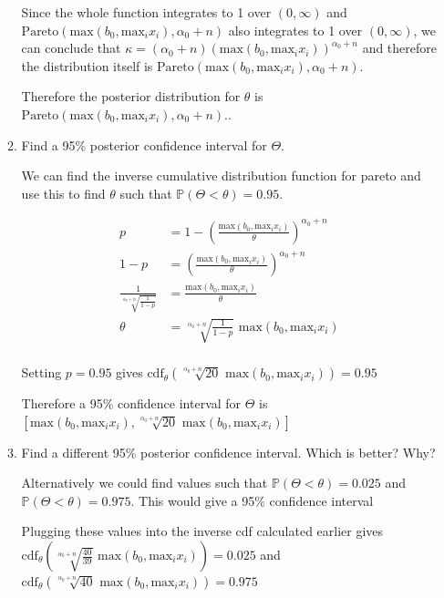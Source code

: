 \documentclass[10pt,\jkfside,a4paper]{article}
\begin{document}
\begin{enumerate}
\begin{enumerate}[label=(\alph*)]
Since the whole function integrates to 1 over $(0, \infty)$ and $\text{Pareto}
(\text{max}\left(b_0, \text{max}_i x_i\right), \alpha_0 + n)$ also integrates to 1 over $(0, \infty)$, we can
conclude that $\kappa = \left(\alpha_0 + n \right)(\text{max}\left(b_0, \text{max}_i x_i\right))^{\alpha_0 + n}$
and therefore the distribution itself is $\text{Pareto}(\text{max}\left(b_0, \text{max}_i x_i\right), \alpha_0 + n)$.

Therefore the posterior distribution for $\theta$ is $\text{Pareto}
(\text{max}\left(b_0, \text{max}_i x_i\right), \alpha_0 + n)$..

\item Find a 95\% posterior confidence interval for $\Theta$.

We can find the inverse cumulative distribution function for pareto and use
this to find $\theta$ such that $\mathbb{P}(\Theta < \theta) = 0.95$.

\[
\begin{split}
p &= 1 - \left(\frac{\text{max}\left(b_0, \text{max}_i x_i\right)}{\theta}\right)^{\alpha_0 + n} \\
1 - p &= \left(\frac{\text{max}\left(b_0, \text{max}_i x_i\right)}{\theta}\right)^{\alpha_0 + n} \\
\frac{1}{\sqrt[\alpha_0 + n]{\frac{1}{1-p}}} &= \frac{\text{max}\left(b_0, \text{max}_i x_i\right)}{\theta} \\
\theta &= \sqrt[\alpha_0 + n]{\frac{1}{1-p}}\text{ max}\left(b_0,
\text{max}_i x_i\right) \\
\end{split}
\]

Setting $p = 0.95$ gives $\text{cdf}_\theta\left(\sqrt[\alpha_0 +
n]{20}\text{ max}\left(b_0, \text{max}_i x_i\right)\right) = 0.95$

Therefore a 95\% confidence interval for $\Theta$ is $[\text{max}\left(b_0, \text{max}_i x_i\right),
\sqrt[\alpha_0 + n]{20} \text{ max}\left(b_0, \text{max}_i x_i\right)]$

\item Find a different 95\% posterior confidence interval. Which is better?
Why?

Alternatively we could find values such that
$\mathbb{P}(\Theta < \theta) = 0.025$ and
$\mathbb{P}(\Theta < \theta) = 0.975$. This would give a 95\% confidence interval

Plugging these values into the inverse cdf calculated earlier gives
$\text{cdf}_\theta\left(\sqrt[\alpha_0 + n]{\frac{40}{39}}\text{ max}\left
(b_0, \text{max}_i x_i\right)\right) = 0.025$
and $\text{cdf}_\theta\left(\sqrt[\alpha_0 + n]{40}\text{ max}\left(b_0,
\text{max}_i x_i\right)\right) = 0.975$


\end{enumerate}
\end{enumerate}
\end{document}
